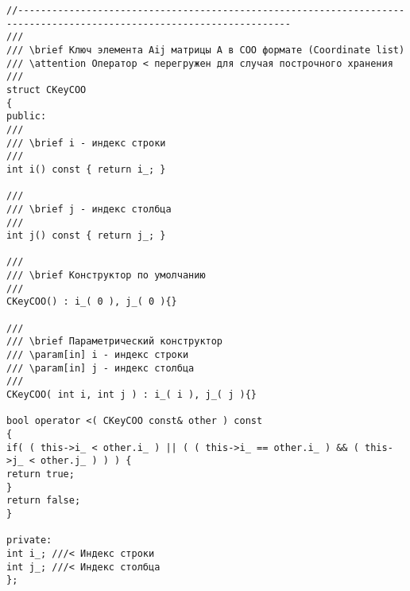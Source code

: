 \begin{lstlisting}
//----------------------------------------------------------------------------------------------------------------------
///
/// \brief Ключ элемента Aij матрицы A в COO формате (Coordinate list)
/// \attention Оператор < перегружен для случая построчного хранения
///
struct CKeyCOO
{
public:
///
/// \brief i - индекс строки
///
int i() const { return i_; }

///
/// \brief j - индекс столбца
///
int j() const { return j_; }

///
/// \brief Конструктор по умолчанию
///
CKeyCOO() : i_( 0 ), j_( 0 ){}

///
/// \brief Параметрический конструктор
/// \param[in] i - индекс строки
/// \param[in] j - индекс столбца
///
CKeyCOO( int i, int j ) : i_( i ), j_( j ){}

bool operator <( CKeyCOO const& other ) const
{
if( ( this->i_ < other.i_ ) || ( ( this->i_ == other.i_ ) && ( this->j_ < other.j_ ) ) ) {
return true;
}
return false;
}

private:
int i_; ///< Индекс строки
int j_; ///< Индекс столбца
};
\end{lstlisting}



